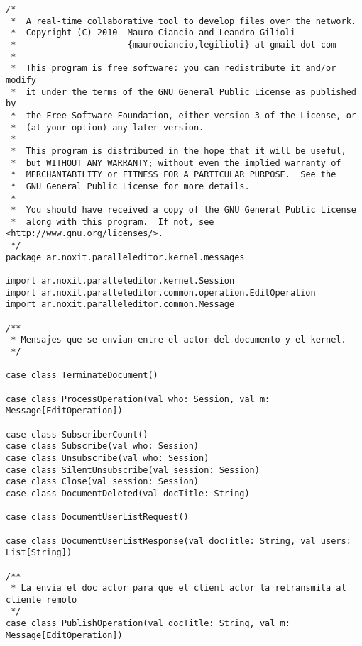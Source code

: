 {
\tiny
\begin{verbatim}
/*
 *  A real-time collaborative tool to develop files over the network.
 *  Copyright (C) 2010  Mauro Ciancio and Leandro Gilioli
 *                      {maurociancio,legilioli} at gmail dot com
 *
 *  This program is free software: you can redistribute it and/or modify
 *  it under the terms of the GNU General Public License as published by
 *  the Free Software Foundation, either version 3 of the License, or
 *  (at your option) any later version.
 *
 *  This program is distributed in the hope that it will be useful,
 *  but WITHOUT ANY WARRANTY; without even the implied warranty of
 *  MERCHANTABILITY or FITNESS FOR A PARTICULAR PURPOSE.  See the
 *  GNU General Public License for more details.
 *
 *  You should have received a copy of the GNU General Public License
 *  along with this program.  If not, see <http://www.gnu.org/licenses/>.
 */
package ar.noxit.paralleleditor.kernel.messages

import ar.noxit.paralleleditor.kernel.Session
import ar.noxit.paralleleditor.common.operation.EditOperation
import ar.noxit.paralleleditor.common.Message

/**
 * Mensajes que se envian entre el actor del documento y el kernel.
 */

case class TerminateDocument()

case class ProcessOperation(val who: Session, val m: Message[EditOperation])

case class SubscriberCount()
case class Subscribe(val who: Session)
case class Unsubscribe(val who: Session)
case class SilentUnsubscribe(val session: Session)
case class Close(val session: Session)
case class DocumentDeleted(val docTitle: String)

case class DocumentUserListRequest()

case class DocumentUserListResponse(val docTitle: String, val users: List[String])

/**
 * La envia el doc actor para que el client actor la retransmita al cliente remoto
 */
case class PublishOperation(val docTitle: String, val m: Message[EditOperation])
\end{verbatim}
}